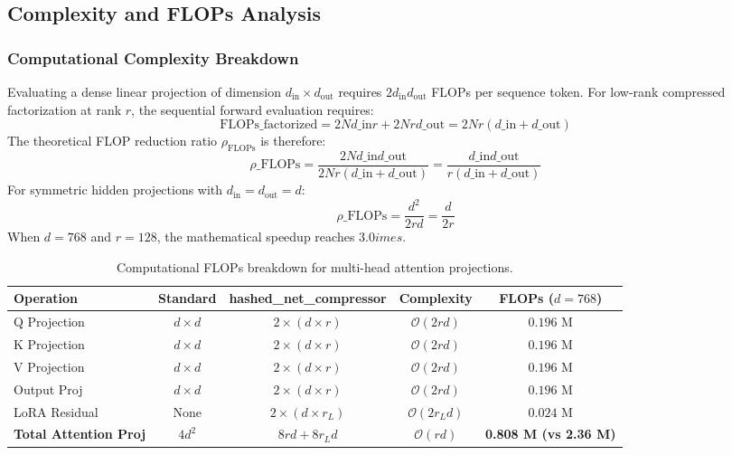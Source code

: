 \subsection{Complexity and FLOPs Analysis}
\subsubsection{Computational Complexity Breakdown}
Evaluating a dense linear projection of dimension $d_{\text{in}} \times d_{\text{out}}$ requires $2 d_{\text{in}} d_{\text{out}}$ FLOPs per sequence token. For low-rank compressed factorization at rank $r$, the sequential forward evaluation requires:
\[
\text{FLOPs}\_{\text{factorized}} = 2 N d\_{\text{in}} r + 2 N r d\_{\text{out}} = 2 N r (d\_{\text{in}} + d\_{\text{out}})
\]
The theoretical FLOP reduction ratio $\rho_{\text{FLOPs}}$ is therefore:
\[
\rho\_{\text{FLOPs}} = \frac{2 N d\_{\text{in}} d\_{\text{out}}}{2 N r (d\_{\text{in}} + d\_{\text{out}})} = \frac{d\_{\text{in}} d\_{\text{out}}}{r (d\_{\text{in}} + d\_{\text{out}})}
\]
For symmetric hidden projections with $d_{\text{in}} = d_{\text{out}} = d$:
\[
\rho\_{\text{FLOPs}} = \frac{d^2}{2 r d} = \frac{d}{2 r}
\]
When $d = 768$ and $r = 128$, the mathematical speedup reaches $3.0	imes$.

\begin{table}[H]
\centering
\small
\begin{tabular}{lcccc}
\toprule
\textbf{Operation} & \textbf{Standard} & \textbf{hashed\_net\_compressor} & \textbf{Complexity} & \textbf{FLOPs ($d=768$)} \\
\midrule
Q Projection & $d \times d$ & $2 \times (d \times r)$ & $\mathcal{O}(2rd)$ & $0.196$ M \\
K Projection & $d \times d$ & $2 \times (d \times r)$ & $\mathcal{O}(2rd)$ & $0.196$ M \\
V Projection & $d \times d$ & $2 \times (d \times r)$ & $\mathcal{O}(2rd)$ & $0.196$ M \\
Output Proj & $d \times d$ & $2 \times (d \times r)$ & $\mathcal{O}(2rd)$ & $0.196$ M \\
LoRA Residual & None & $2 \times (d \times r_L)$ & $\mathcal{O}(2r_L d)$ & $0.024$ M \\
\midrule
\textbf{Total Attention Proj} & $4 d^2$ & $8rd + 8r_L d$ & $\mathcal{O}(rd)$ & \textbf{0.808 M (vs 2.36 M)} \\
\bottomrule
\end{tabular}
\caption{Computational FLOPs breakdown for multi-head attention projections.}
\end{table}

